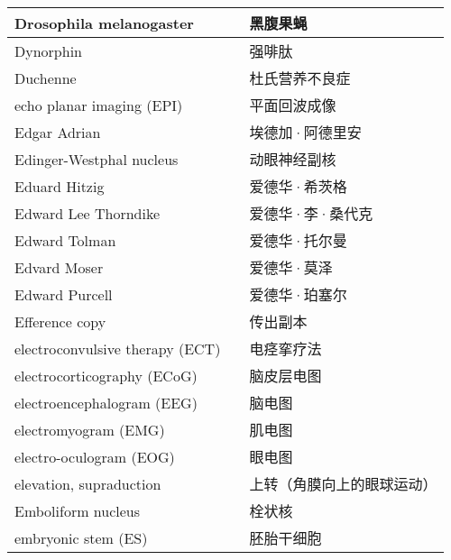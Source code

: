 \begin{longtable}{lll}
	\midrule
	Drosophila melanogaster     &&  黑腹果蝇  \\
	
	\midrule
	Dynorphin     &&  强啡肽  \\
	
	\midrule
	Duchenne     &&  杜氏营养不良症  \\
	
	\midrule
	echo planar imaging (EPI)     &&  平面回波成像  \\
	
	\midrule
	Edgar Adrian     &&  埃德加·阿德里安  \\
	
	\midrule
	Edinger-Westphal nucleus     &&  动眼神经副核  \\
	
	\midrule
	Eduard Hitzig     &&  爱德华·希茨格  \\
	
	\midrule
	Edward Lee Thorndike     &&  爱德华·李·桑代克  \\
	
	\midrule
	Edward Tolman     &&  爱德华·托尔曼  \\
	
	\midrule
	Edvard Moser     &&  爱德华·莫泽  \\
	
	\midrule
	Edward Purcell     &&  爱德华·珀塞尔  \\
	
	\midrule
	Efference copy     &&  传出副本  \\
	
	\midrule
	electroconvulsive therapy (ECT)     &&  电痉挛疗法  \\
	
	\midrule
	electrocorticography (ECoG)     &&  脑皮层电图  \\
	
	\midrule
	electroencephalogram (EEG)   &&  脑电图  \\
	
	\midrule
	electromyogram (EMG)     &&  肌电图  \\
	
	\midrule
	electro-oculogram (EOG)     &&  眼电图  \\
	
	\midrule
	elevation, supraduction     &&  上转（角膜向上的眼球运动）  \\
	
	\midrule
	Emboliform nucleus     &&  栓状核  \\
	
	\midrule
	embryonic stem  (ES)   &&  胚胎干细胞  \\
	

\end{longtable}
